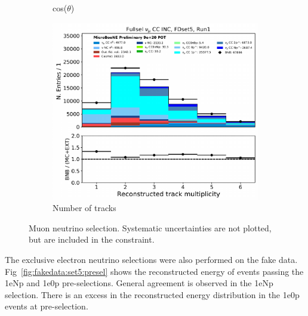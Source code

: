 \begin{figure}[H]
\begin{center}
\begin{subfigure}[b]{0.3\textwidth}
    \caption{\label{fig:fakedata:set5:numu_costheta} cos($\theta$)}
    \end{subfigure}
    \begin{subfigure}[b]{0.3\textwidth}
    \centering
    \includegraphics[width=1.00\textwidth]{Fakedata/set5/numu_ntracks.pdf}
    \caption{\label{fig:fakedata:set5:numu_ntracks} Number of tracks}
    \end{subfigure}
\caption{\label{fig:fakedata:set5:numu} Muon neutrino selection. Systematic uncertainties are not plotted, but are included in the constraint.}
\end{center}
\end{figure}

The exclusive electron neutrino selections were also performed on the fake data. Fig~\ref{fig:fakedata:set5:presel} shows the reconstructed energy of events passing the 1eNp and 1e0p pre-selections.  General agreement is observed in the 1eNp selection.  There is an excess in the reconstructed energy distribution in the 1e0p events at pre-selection.

